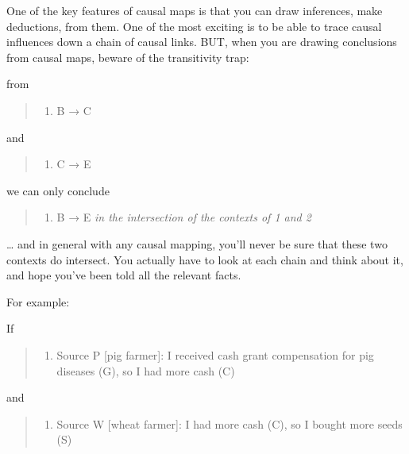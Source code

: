 \documentclass[
]{book}
\providecommand{\tightlist}{%
  \setlength{\itemsep}{0pt}\setlength{\parskip}{0pt}}
\begin{document}
One of the key features of causal maps is that you can draw inferences, make deductions, from them. One of the most exciting is to be able to trace causal influences down a chain of causal links. BUT, when you are drawing conclusions from causal maps, beware of the transitivity trap:

from

\begin{quote}
\begin{enumerate}
\def\labelenumi{\arabic{enumi})}
\tightlist
\item
  B → C
\end{enumerate}
\end{quote}

and

\begin{quote}
\begin{enumerate}
\def\labelenumi{\arabic{enumi})}
\setcounter{enumi}{1}
\tightlist
\item
  C → E
\end{enumerate}
\end{quote}

we can only conclude

\begin{quote}
\begin{enumerate}
\def\labelenumi{\arabic{enumi})}
\setcounter{enumi}{2}
\tightlist
\item
  B → E \emph{in the intersection of the contexts of 1 and 2}
\end{enumerate}
\end{quote}

\ldots{} and in general with any causal mapping, you'll never be sure that these two contexts do intersect. You actually have to look at each chain and think about it, and hope you've been told all the relevant facts.

For example:

If

\begin{quote}
\begin{enumerate}
\def\labelenumi{\arabic{enumi})}
\tightlist
\item
  Source P {[}pig farmer{]}: I received cash grant compensation for pig diseases (G), so I had more cash (C)
\end{enumerate}
\end{quote}

and

\begin{quote}
\begin{enumerate}
\def\labelenumi{\arabic{enumi})}
\setcounter{enumi}{1}
\tightlist
\item
  Source W {[}wheat farmer{]}: I had more cash (C), so I bought more seeds (S)
\end{enumerate}
\end{quote}
\end{document}
